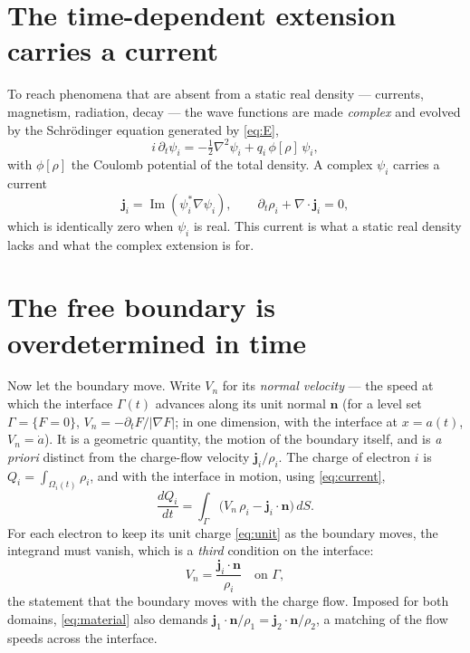 \documentclass[11pt]{article}
\begin{document}
\section{The time-dependent extension carries a current}
\label{sec:complex}

To reach phenomena that are absent from a static real density --- currents, magnetism, radiation, decay ---
the wave functions are made \emph{complex} and evolved by the Schr\"odinger equation generated by
\eqref{eq:E},
\begin{equation}
i\,\partial_t\psi_i=-\tfrac12\nabla^2\psi_i+q_i\,\phi[\rho]\,\psi_i ,
\label{eq:tdse}
\end{equation}
with $\phi[\rho]$ the Coulomb potential of the total density. A complex $\psi_i$ carries a current
\begin{equation}
\mathbf j_i=\operatorname{Im}(\psi_i^*\nabla\psi_i),\qquad \partial_t\rho_i+\nabla\!\cdot\mathbf j_i=0 ,
\label{eq:current}
\end{equation}
which is identically zero when $\psi_i$ is real. This current is what a static real density lacks and what
the complex extension is for.

\section{The free boundary is overdetermined in time}
\label{sec:over}

Now let the boundary move. Write $V_n$ for its \emph{normal velocity} --- the speed at which the interface
$\Gamma(t)$ advances along its unit normal $\mathbf n$ (for a level set $\Gamma=\{F=0\}$,
$V_n=-\partial_tF/|\nabla F|$; in one dimension, with the interface at $x=a(t)$, $V_n=\dot a$). It is a
geometric quantity, the motion of the boundary itself, and is \emph{a priori} distinct from the charge-flow
velocity $\mathbf j_i/\rho_i$. The charge of electron $i$ is $Q_i=\int_{\Omega_i(t)}\rho_i$, and with the
interface in motion, using \eqref{eq:current},
\begin{equation}
\frac{dQ_i}{dt}=\int_{\Gamma}\big(V_n\,\rho_i-\mathbf j_i\!\cdot\!\mathbf n\big)\,dS .
\label{eq:dQ}
\end{equation}
For each electron to keep its unit charge \eqref{eq:unit} as the boundary moves, the integrand must vanish,
which is a \emph{third} condition on the interface:
\begin{equation}
V_n=\frac{\mathbf j_i\!\cdot\!\mathbf n}{\rho_i}\quad\text{on }\Gamma,
\label{eq:material}
\end{equation}
the statement that the boundary moves with the charge flow. Imposed for both domains, \eqref{eq:material}
also demands $\mathbf j_1\!\cdot\!\mathbf n/\rho_1=\mathbf j_2\!\cdot\!\mathbf n/\rho_2$, a matching of the
flow speeds across the interface.
\end{document}
